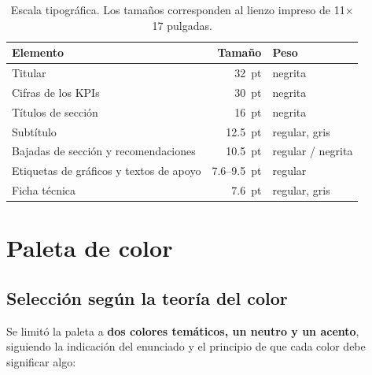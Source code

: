 \documentclass[12pt,letterpaper]{article}
\begin{document}
\begin{table}[H]
\centering
\small
\begin{tabular}{lrl}
\toprule
\textbf{Elemento} & \textbf{Tamaño} & \textbf{Peso} \\
\midrule
Titular & 32~pt & negrita \\
Cifras de los KPIs & 30~pt & negrita \\
Títulos de sección & 16~pt & negrita \\
Subtítulo & 12.5~pt & regular, gris \\
Bajadas de sección y recomendaciones & 10.5~pt & regular / negrita \\
Etiquetas de gráficos y textos de apoyo & 7.6--9.5~pt & regular \\
Ficha técnica & 7.6~pt & regular, gris \\
\bottomrule
\end{tabular}
\caption{Escala tipográfica. Los tamaños corresponden al lienzo impreso de 11$\times$17 pulgadas.}
\end{table}

\section{Paleta de color}

\subsection{Selección según la teoría del color}

Se limitó la paleta a \textbf{dos colores temáticos, un neutro y un acento}, siguiendo la
indicación del enunciado y el principio de que cada color debe significar algo:
\end{document}
